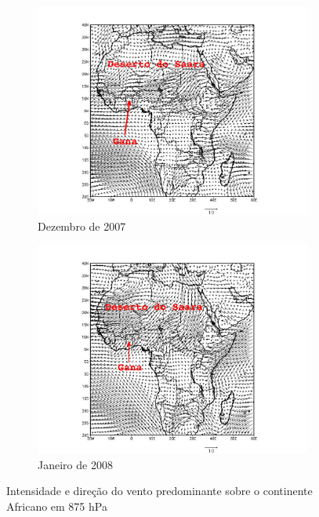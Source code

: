\newpage
\begin{figure}[H]
  \centering
  \begin{subfigure}[b]{0.5\linewidth}
    \includegraphics[width=\linewidth]{../inputs/grads/gimp/875hPa/DEZ_2007.pdf}
    \caption{Dezembro de 2007}
  \end{subfigure}%
  \begin{subfigure}[b]{0.5\linewidth}
    \includegraphics[width=\linewidth]{../inputs/grads/gimp/875hPa/JAN_2008.pdf}
    \caption{Janeiro de 2008}
  \end{subfigure}
  \caption{Intensidade e direção do vento predominante sobre o continente Africano
           em 875 hPa }
\end{figure}

